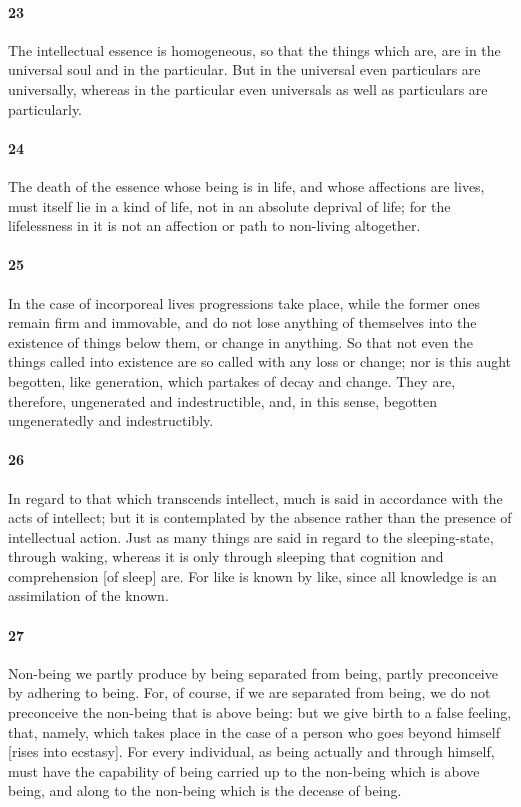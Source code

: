 \documentclass[12pt]{article}
\begin{document}
\paragraph{23} The intellectual es\-sence is homogeneous, so that the things
which are, are in the universal soul and in the particular. But in the
universal even particulars are universally, whereas in the particular even
universals as well as particulars are particularly.

\paragraph{24} The death of the es\-sence whose being is in life, and whose
affections are lives, must itself lie in a kind of life, not in an absolute
deprival of life; for the lifelessness in it is not an affection or path to
non-living altogether.

\paragraph{25} In the case of incorporeal lives progressions take place, while
the former ones remain firm and immovable, and do not lose anything of
themselves into the existence of things below them, or change in anything. So
that not even the things called into existence are so called with any loss or
change; nor is this aught begotten, like generation, which partakes of decay
and change. They are, therefore, ungenerated and indestructible, and, in this
sense, begotten ungeneratedly and indestructibly.

\paragraph{26} In regard to that which transcends intellect, much is said in
accordance with the acts of intellect; but it is contemplated by the absence
rather than the presence of intellectual action. Just as many things are said
in regard to the sleeping-state, through waking, whereas it is only through
sleeping that cognition and comprehension [of sleep] are. For like is known by
like, since all knowledge is an assimilation of the known.

\paragraph{27} Non-being we partly produce by being separated from being,
partly preconceive by adhering to being. For, of course, if we are separated
from being, we do not preconceive the non-being that is above being: but we
give birth to a false feeling, that, namely, which takes place in the case of a
person who goes beyond himself [rises into ecstasy]. For every individual, as
being actually and through himself, must have the capability of being carried
up to the non-being which is above being, and along to the non-being which is
the decease of being.
\end{document}
